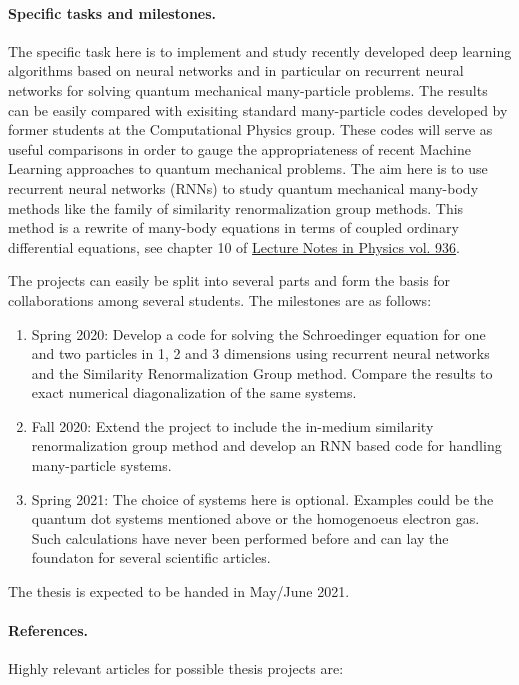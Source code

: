 \documentclass[%
oneside,                 %
final,                   %
10pt]{article}
\begin{document}
\paragraph{Specific tasks and milestones.}
The specific task here is to implement and study recently developed
deep learning algorithms based on neural networks and in particular on
recurrent neural networks for solving quantum mechanical many-particle
problems. The results can be easily compared with exisiting standard
many-particle codes developed by former students at the Computational
Physics group. These codes will serve as useful comparisons in order
to gauge the appropriateness of recent Machine Learning approaches to
quantum mechanical problems.  The aim here is to use recurrent neural
networks (RNNs) to study quantum mechanical many-body methods like the family
of similarity renormalization group methods.  This method is a rewrite
of many-body equations in terms of coupled ordinary differential
equations, see chapter 10 of \href{{https://www.springer.com/gp/book/9783319533353}}{Lecture Notes in Physics
vol. 936}.



The projects can easily be split into several parts and form the basis
for collaborations among several students. The milestones are as
follows:


\begin{enumerate}
\item Spring 2020: Develop a code for solving the Schroedinger equation for one and two particles in 1, 2 and 3 dimensions using recurrent neural networks and the Similarity Renormalization Group method. Compare the results to exact numerical diagonalization of the same systems.

\item Fall 2020: Extend the project to include the in-medium similarity renormalization group method and develop an RNN based code for handling many-particle systems.

\item Spring 2021: The choice of systems here is optional. Examples could be the quantum dot systems mentioned above or the homogenoeus electron gas. Such calculations have never been performed before and can lay the foundaton for several scientific articles.
\end{enumerate}

\noindent
The thesis is expected to be handed in May/June  2021.

\paragraph{References.}
Highly relevant articles for possible thesis projects are:
\end{document}
